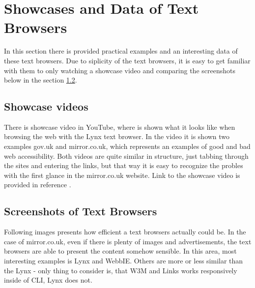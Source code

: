 \section{Showcases and Data of Text Browsers}
\label{tb-general}
In this section there is provided practical examples and an interesting data  of these text browsers. Due to siplicity of the text browsers, it is easy to get familiar with them to only watching a showcase video and comparing the screenshots below in the section \ref*{tb-screenshots}.
\subsection{Showcase videos}
\label{tb-showcase}
There is showcase video in YouTube, where is shown what it looks like when browsing the web with the Lynx text browser. In the video it is shown two examples gov.uk and mirror.co.uk, which represents an examples of good and bad web accessibility. Both videos are quite similar in structure, just tabbing through the sites and entering the links, but that way it is easy to recognize the probles with the first glance in the mirror.co.uk website. Link to the showcase video is provided in reference \textcite{tb-showcase}.
\subsection{Screenshots of Text Browsers}
\label{tb-screenshots}
Following images presents how efficient a text browsers actually could be. In the case of mirror.co.uk, even if there is plenty of images and advertisements, the text browsers are able to present the content somehow sensible. In this area, most interesting examples is Lynx and WebbIE. Others are more or less similar than the Lynx - only thing to consider is, that W3M and Links works responsively inside of CLI, Lynx does not. 

